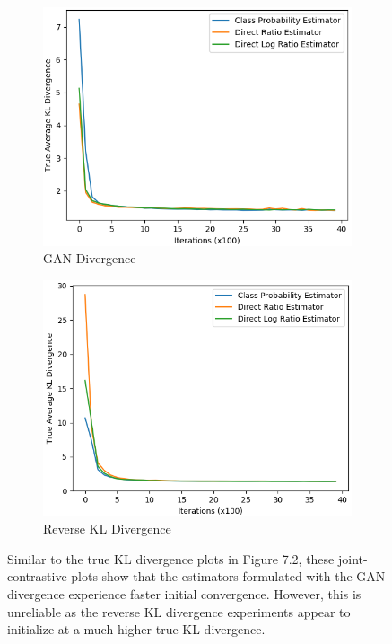 \documentclass[honours,12pt, twoside]{unswthesis}
\numberwithin{equation}{section}
\theoremstyle{definition}
\begin{document}
\begin{figure}[h]
\begin{subfigure}{0.49\textwidth}
\includegraphics[width=\linewidth]{part2truklmins/JCADVvsJCADVexpvsJCADVgudlog.png}
\caption{GAN Divergence}
\end{subfigure}
\begin{subfigure}{0.49\textwidth}
\includegraphics[width=\linewidth]{part2truklmins/JCKLDvsJCKLexpvsJCKLgudlog.png}
\caption{Reverse KL Divergence}
\end{subfigure}
\caption{\small Similar to the true KL divergence plots in Figure 7.2, these joint-contrastive plots show that the estimators formulated with the GAN divergence experience faster initial convergence. However, this is unreliable as the reverse KL divergence experiments appear to initialize at a much higher true KL divergence.}
\end{figure}
\end{document}
